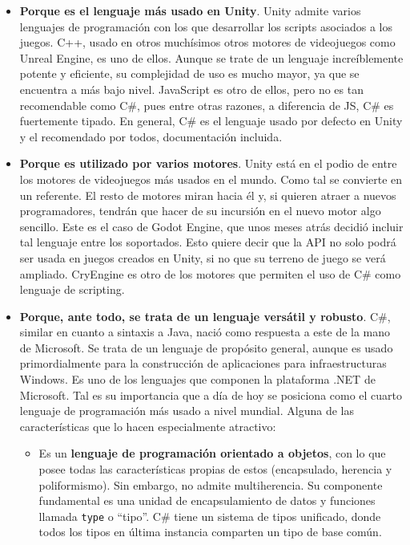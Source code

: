 \begin{itemize}
\item\textbf{Porque es el lenguaje más usado en Unity}. Unity admite varios lenguajes de programación con los que desarrollar los scripts asociados a los juegos. C++, usado en otros muchísimos otros motores de videojuegos como Unreal Engine, es uno de ellos. Aunque se trate de un lenguaje increíblemente potente y eficiente, su complejidad de uso es mucho mayor, ya que se encuentra a más bajo nivel. JavaScript es otro de ellos, pero no es tan recomendable como C\#, pues entre otras razones, a diferencia de JS, C\# es fuertemente tipado\cite{unityinaction}. En general, C\# es el lenguaje usado por defecto en Unity y el recomendado por todos, documentación incluida.
\item\textbf{Porque es utilizado por varios motores}. Unity está en el podio de entre los motores de videojuegos más usados en el mundo. Como tal se convierte en un referente. El resto de motores miran hacia él y, si quieren atraer a nuevos programadores, tendrán que hacer de su incursión en el nuevo motor algo sencillo. Este es el caso de Godot Engine, que unos meses atrás decidió incluir tal lenguaje entre los soportados\cite{godotcs}. Esto quiere decir que la API no solo podrá ser usada en juegos creados en Unity, si no que su terreno de juego se verá ampliado. CryEngine es otro de los motores que permiten el uso de C\# como lenguaje de scripting.
\item\textbf{Porque, ante todo, se trata de un lenguaje versátil y robusto}. C\#, similar en cuanto a sintaxis a Java, nació como respuesta a este de la mano de Microsoft. Se trata de un lenguaje de propósito general, aunque es usado primordialmente para la construcción de aplicaciones para infraestructuras Windows. Es uno de los lenguajes que componen la plataforma .NET de Microsoft. Tal es su importancia que a día de hoy se posiciona como el cuarto lenguaje de programación más usado a nivel mundial\cite{csisfamous}. Alguna de las características que lo hacen especialmente atractivo:
\begin{itemize}
\item Es un \textbf{lenguaje de programación orientado a objetos}, con lo que posee todas las características propias de estos (encapsulado, herencia y poliformismo). Sin embargo, no admite multiherencia. Su componente fundamental es una unidad de encapsulamiento de datos y
funciones llamada \texttt{type} o ``tipo''. C\# tiene un sistema de tipos unificado, donde todos los tipos en última instancia comparten un tipo de base común.

\end{itemize}
\end{itemize}
